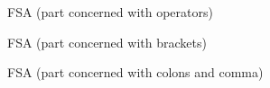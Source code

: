 \documentclass[a4paper, 12pt]{article}
\begin{document}
\begin{figure}[h]
    \centering
    \caption{FSA (part concerned with operators)}
\end{figure}

\begin{figure}[h]
    \centering
    \caption{FSA (part concerned with brackets)}
\end{figure}


\begin{figure}[h]
    \centering
    \caption{FSA (part concerned with colons and comma)}
\end{figure}
\end{document}

